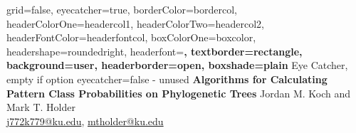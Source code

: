 \documentclass[a0paper,landscape]{baposter}
\begin{document}


\begin{poster}{
	grid=false,
	eyecatcher=true, 
	borderColor=bordercol,
	headerColorOne=headercol1,
	headerColorTwo=headercol2,
	headerFontColor=headerfontcol,
	boxColorOne=boxcolor,
	headershape=roundedright,
	headerfont=\Large\sf\bf,
	textborder=rectangle,
	background=user,
	headerborder=open,
  boxshade=plain
}
{
	Eye Catcher, empty if option eyecatcher=false - unused
}
{\bf
	Algorithms for Calculating Pattern Class Probabilities on Phylogenetic Trees
}
{
	\vspace{1em} Jordan M. Koch and Mark T. Holder\\
	{\smaller \url{j772k779@ku.edu}, \url{mtholder@ku.edu}}
}
{

\setlength\fboxsep{0pt}
\setlength\fboxrule{0.5pt}
	\fbox{
		\begin{minipage}{4em}
		\end{minipage}
	}
}


\end{poster}
\end{document}
